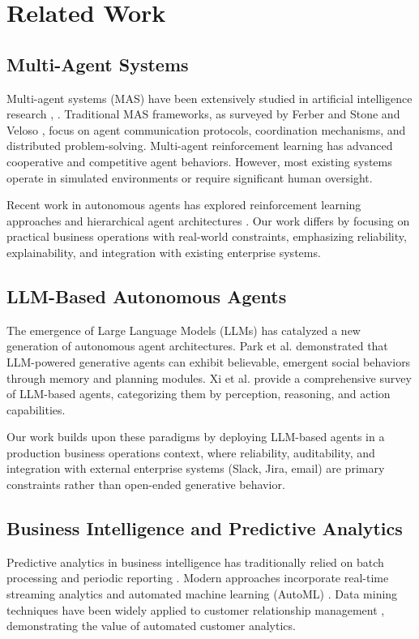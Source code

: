 \documentclass[conference]{IEEEtran}
\begin{document}
\section{Related Work}

\subsection{Multi-Agent Systems}
Multi-agent systems (MAS) have been extensively studied in artificial intelligence research \cite{wooldridge2009introduction}, \cite{russell2020artificial}. Traditional MAS frameworks, as surveyed by Ferber \cite{ferber1999multi} and Stone and Veloso \cite{stone2000multiagent}, focus on agent communication protocols, coordination mechanisms, and distributed problem-solving. Multi-agent reinforcement learning \cite{busoniu2008comprehensive} has advanced cooperative and competitive agent behaviors. However, most existing systems operate in simulated environments or require significant human oversight.

Recent work in autonomous agents has explored reinforcement learning approaches \cite{sutton2018reinforcement} and hierarchical agent architectures \cite{dayan1992feudal}. Our work differs by focusing on practical business operations with real-world constraints, emphasizing reliability, explainability, and integration with existing enterprise systems.

\subsection{LLM-Based Autonomous Agents}
The emergence of Large Language Models (LLMs) has catalyzed a new generation of autonomous agent architectures. Park et al. \cite{park2023generative} demonstrated that LLM-powered generative agents can exhibit believable, emergent social behaviors through memory and planning modules. Xi et al. \cite{xi2023rise} provide a comprehensive survey of LLM-based agents, categorizing them by perception, reasoning, and action capabilities.

Our work builds upon these paradigms by deploying LLM-based agents in a production business operations context, where reliability, auditability, and integration with external enterprise systems (Slack, Jira, email) are primary constraints rather than open-ended generative behavior.

\subsection{Business Intelligence and Predictive Analytics}
Predictive analytics in business intelligence has traditionally relied on batch processing and periodic reporting \cite{shmueli2016predictive}. Modern approaches incorporate real-time streaming analytics \cite{bifet2018machine} and automated machine learning (AutoML) \cite{he2021automl}. Data mining techniques have been widely applied to customer relationship management \cite{ngai2009application}, demonstrating the value of automated customer analytics.
\end{document}
